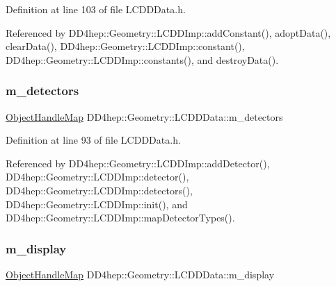Definition at line 103 of file L\+C\+D\+D\+Data.\+h.



Referenced by D\+D4hep\+::\+Geometry\+::\+L\+C\+D\+D\+Imp\+::add\+Constant(), adopt\+Data(), clear\+Data(), D\+D4hep\+::\+Geometry\+::\+L\+C\+D\+D\+Imp\+::constant(), D\+D4hep\+::\+Geometry\+::\+L\+C\+D\+D\+Imp\+::constants(), and destroy\+Data().

\hypertarget{class_d_d4hep_1_1_geometry_1_1_l_c_d_d_data_af9733efff6b4cb6c8db334a65bff61c7}{}\label{class_d_d4hep_1_1_geometry_1_1_l_c_d_d_data_af9733efff6b4cb6c8db334a65bff61c7} 
\subsubsection{\texorpdfstring{m\+\_\+detectors}{m\_detectors}}
{\footnotesize\ttfamily \hyperlink{class_d_d4hep_1_1_geometry_1_1_l_c_d_d_data_1_1_object_handle_map}{Object\+Handle\+Map} D\+D4hep\+::\+Geometry\+::\+L\+C\+D\+D\+Data\+::m\+\_\+detectors\hspace{0.3cm}{\ttfamily [protected]}}



Definition at line 93 of file L\+C\+D\+D\+Data.\+h.



Referenced by D\+D4hep\+::\+Geometry\+::\+L\+C\+D\+D\+Imp\+::add\+Detector(), D\+D4hep\+::\+Geometry\+::\+L\+C\+D\+D\+Imp\+::detector(), D\+D4hep\+::\+Geometry\+::\+L\+C\+D\+D\+Imp\+::detectors(), D\+D4hep\+::\+Geometry\+::\+L\+C\+D\+D\+Imp\+::init(), and D\+D4hep\+::\+Geometry\+::\+L\+C\+D\+D\+Imp\+::map\+Detector\+Types().

\hypertarget{class_d_d4hep_1_1_geometry_1_1_l_c_d_d_data_a757b3e4c1dbd399b518551a689ac6614}{}\label{class_d_d4hep_1_1_geometry_1_1_l_c_d_d_data_a757b3e4c1dbd399b518551a689ac6614} 
\subsubsection{\texorpdfstring{m\+\_\+display}{m\_display}}
{\footnotesize\ttfamily \hyperlink{class_d_d4hep_1_1_geometry_1_1_l_c_d_d_data_1_1_object_handle_map}{Object\+Handle\+Map} D\+D4hep\+::\+Geometry\+::\+L\+C\+D\+D\+Data\+::m\+\_\+display\hspace{0.3cm}{\ttfamily [protected]}}



